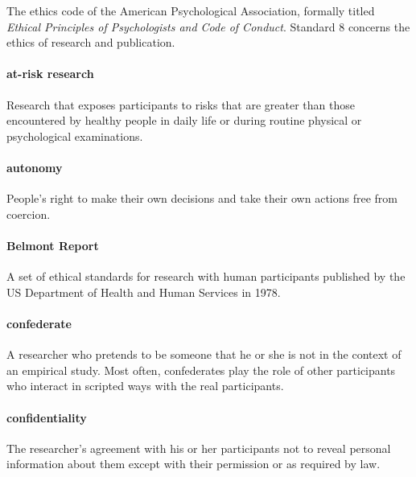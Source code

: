 \documentclass[
]{krantz}
\begin{document}
The ethics code of the American Psychological Association, formally titled \emph{Ethical Principles of Psychologists and Code of Conduct}. Standard 8 concerns the ethics of research and publication.

\paragraph*{at-risk research}\label{at-risk-research}

Research that exposes participants to risks that are greater than those encountered by healthy people in daily life or during routine physical or psychological examinations.

\paragraph*{autonomy}\label{autonomy}

People's right to make their own decisions and take their own actions free from coercion.

\paragraph*{Belmont Report}\label{belmont-report}

A set of ethical standards for research with human participants published by the US Department of Health and Human Services in 1978.

\paragraph*{confederate}\label{confederate}

A researcher who pretends to be someone that he or she is not in the context of an empirical study. Most often, confederates play the role of other participants who interact in scripted ways with the real participants.

\paragraph*{confidentiality}\label{confidentiality}

The researcher's agreement with his or her participants not to reveal personal information about them except with their permission or as required by law.
\end{document}
